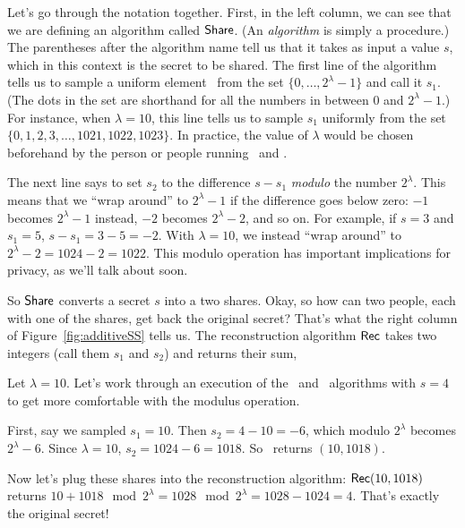 Let's go through the notation together. First, in the left column, we can see that 
we are defining an algorithm called $\mathsf{Share}$. (An \emph{algorithm} is simply a procedure.)
The parentheses after the algorithm name tell us that it takes as input a value $s$, which in 
this context is the secret to be shared. The first line of the algorithm tells us to sample
a uniform element\footnotemark~ from the set $\{0, \ldots, 2^\lambda-1\}$ and call it $s_1$. 
(The dots in the set are shorthand for all the numbers in between 0 and $2^\lambda-1$.) For instance, 
when $\lambda=10$, this line tells us to sample $s_1$ uniformly from the set $\{0, 1, 2, 3, \ldots, 
1021, 1022, 1023\}$. In practice, the value of $\lambda$ would be chosen beforehand by 
the person or people running \share~and \rec.

The next line says to set $s_2$ to the difference $s-s_1$ \emph{modulo} 
the number $2^\lambda$. This means that we ``wrap around'' to $2^\lambda-1$ 
if the difference goes below zero: $-1$ becomes $2^\lambda-1$ instead, $-2$ becomes 
$2^\lambda-2$, and so on.
For example, if $s=3$ and $s_1=5$, $s-s_1 = 3-5 = -2$. With $\lambda=10$,
we instead ``wrap around'' to $2^\lambda-2=1024-2=1022$. This modulo operation has 
important implications for privacy, as we'll talk about soon.


So $\mathsf{Share}$ converts a secret $s$ into a two shares. Okay, so how can 
two people, each with one of the shares, get back the original secret? That's
what the right column of Figure~\ref{fig:additiveSS} tells us. The reconstruction 
algorithm $\mathsf{Rec}$ takes two integers (call them $s_1$ and $s_2$) and returns their 
sum,

\begin{example}
    Let $\lambda=10$. Let's work through an execution of the \share~and
    \rec~algorithms with $s=4$ to get more comfortable with the modulus 
    operation.

    First, say we sampled $s_1=10$. Then $s_2 = 4-10 = -6$, which modulo 
    $2^\lambda$ becomes $2^\lambda-6$. Since $\lambda=10$, $s_2=1024-6=1018$.
    So \share~returns $(10,1018)$.

    Now let's plug these shares into the reconstruction algorithm: 
    $\mathsf{Rec}(10,1018)$ returns $10+1018 \mod 2^\lambda = 1028 \mod 2^\lambda 
    = 1028-1024 = 4$. That's exactly the original secret!
\end{example}

